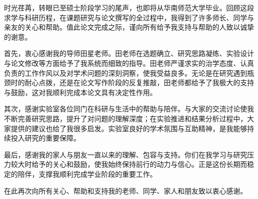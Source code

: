 
\begin{ack}

  时光荏苒，转眼已至硕士阶段学习的尾声，也即将从华南师范大学毕业。回顾这段求学与科研历程，在课题研究与论文撰写的全过程中，我得到了许多师长、同学与亲友的关心和帮助。值此论文完成之际，谨向所有给予我支持与帮助的人致以诚挚的谢意。

  首先，衷心感谢我的导师田星老师。田老师在选题确立、研究思路凝练、实验设计与论文修改等方面给予了我系统而细致的指导。田老师严谨求实的治学态度、认真负责的工作作风以及对学术问题的深刻洞察，使我受益良多。无论是在研究遇到瓶颈时的耐心点拨，还是在论文写作阶段的反复推敲，田老师都给予了我极大的支持与鼓励，这对我顺利完成本论文具有决定性作用。

  其次，感谢实验室各位同门在科研与生活中的帮助与陪伴。与大家的交流讨论使我不断完善研究思路，提升了对问题的理解深度；在实验推进和结果分析过程中，大家提供的建议也给了我很多启发。实验室良好的学术氛围与互助精神，是我能够持续投入研究的重要保障。

  最后，感谢我的家人与朋友一直以来的理解、包容与支持。你们在我学习与研究压力较大时给予的关心和鼓励，使我始终保持前行的动力与信心。正是这份长期而稳定的陪伴，支撑我顺利完成学业阶段的重要工作。

  在此再次向所有关心、帮助和支持我的老师、同学、家人和朋友致以衷心感谢。

\end{ack}
